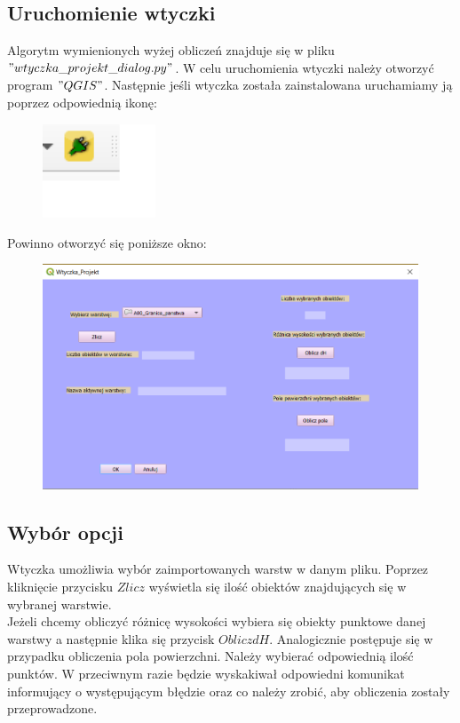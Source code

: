 \documentclass[a4paper,12pt]{article}
\begin{document}
	\subsection{Uruchomienie wtyczki}
	Algorytm wymienionych wyżej obliczeń znajduje się w pliku $"wtyczka\_projekt\_dialog.py"$. W celu uruchomienia wtyczki należy otworzyć program $"QGIS"$. Następnie jeśli wtyczka została zainstalowana uruchamiamy ją poprzez odpowiednią ikonę:
	\begin{figure}[H]
		\centering
		\includegraphics[width=0.3\textwidth]{w.png}
	\end{figure}
 Powinno otworzyć się poniższe okno:
	\begin{figure}[H]
		\centering
		\includegraphics[width=1\textwidth]{wtyczunia.png}
	\end{figure}
		\subsection{Wybór opcji}
		Wtyczka umożliwia wybór zaimportowanych warstw w danym pliku. Poprzez kliknięcie przycisku $ Zlicz$ wyświetla się ilość obiektów znajdujących się w wybranej warstwie.\\
		Jeżeli chcemy obliczyć różnicę wysokości wybiera się obiekty punktowe danej warstwy a następnie klika się przycisk $Oblicz  dH$. Analogicznie postępuje się w przypadku obliczenia pola powierzchni. Należy wybierać odpowiednią ilość punktów. W przeciwnym razie będzie wyskakiwał odpowiedni komunikat informujący o występującym błędzie oraz co należy zrobić, aby obliczenia zostały przeprowadzone.
\end{document}
